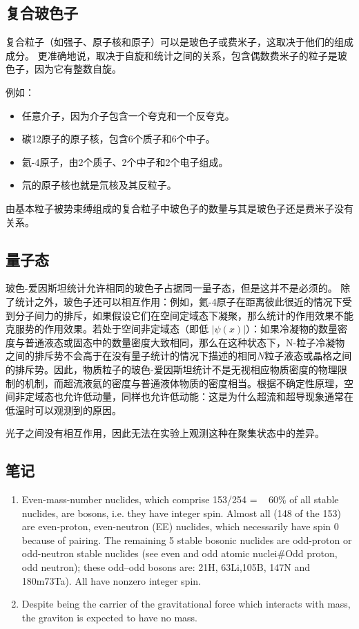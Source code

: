 \subsection{复合玻色子}
复合粒子（如强子、原子核和原子）可以是玻色子或费米子，这取决于他们的组成成分。 更准确地说，取决于自旋和统计之间的关系，包含偶数费米子的粒子是玻色子，因为它有整数自旋。

例如：
\begin{itemize}
\item 任意介子，因为介子包含一个夸克和一个反夸克。
\item 碳12原子的原子核，包含6个质子和6个中子。
\item 氦-4原子，由2个质子、2个中子和2个电子组成。
\item 氘的原子核也就是氘核及其反粒子。
\end{itemize}
由基本粒子被势束缚组成的复合粒子中玻色子的数量与其是玻色子还是费米子没有关系。

\subsection{ 量子态}
玻色-爱因斯坦统计允许相同的玻色子占据同一量子态，但是这并不是必须的。 除了统计之外，玻色子还可以相互作用：例如，氦-4原子在距离彼此很近的情况下受到分子间力的排斥，如果假设它们在空间定域态下凝聚，那么统计的作用效果不能克服势的作用效果。若处于空间非定域态（即低 $|\psi(x)|$）：如果冷凝物的数量密度与普通液态或固态中的数量密度大致相同，那么在这种状态下，N-粒子冷凝物之间的排斥势不会高于在没有量子统计的情况下描述的相同$N$粒子液态或晶格之间的排斥势。因此，物质粒子的玻色-爱因斯坦统计不是无视相应物质密度的物理限制的机制，而超流液氦的密度与普通液体物质的密度相当。根据不确定性原理，空间非定域态也允许低动量，同样也允许低动能：这是为什么超流和超导现象通常在低温时可以观测到的原因。

光子之间没有相互作用，因此无法在实验上观测这种在聚集状态中的差异。

\subsection{笔记}
\begin{enumerate}
\item Even-mass-number nuclides, which comprise 153/254 = ~ 60\% of all stable nuclides, are bosons, i.e. they have integer spin. Almost all (148 of the 153) are even-proton, even-neutron (EE) nuclides, which necessarily have spin 0 because of pairing. The remaining 5 stable bosonic nuclides are odd-proton or odd-neutron stable nuclides (see even and odd atomic nuclei#Odd proton, odd neutron); these odd–odd bosons are: 21H, 63Li,105B, 147N and 180m73Ta). All have nonzero integer spin.
\item Despite being the carrier of the gravitational force which interacts with mass, the graviton is expected to have no mass.
\end{enumerate}
